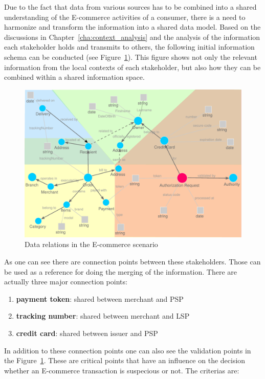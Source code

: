 Due to the fact that data from various sources has to be combined into a shared understanding of the \gls{E-commerce} activities of a consumer, there is a need to harmonize and transform the information into a shared data model. Based on the discussions in Chapter~\ref{cha:context_analysis} and the analysis of the information each stakeholder holds and transmits to others, the following initial information schema can be conducted (see Figure~\ref{fig:images_data_model}). This figure shows not only the relevant information from the local contexts of each stakeholder, but also how they can be combined within a shared information space. \\

\begin{figure}[!ht]
  \centering
  \includegraphics[width=0.9\columnwidth]{images/ontology_scenario_1.pdf}
  \caption{Data relations in the \gls{E-commerce} scenario\protect\footnotemark}
\label{fig:images_data_model}
\end{figure}

As one can see there are connection points between these stakeholders. Those can be used as a reference for doing the merging of the information. There are actually three major connection points: \@

\begin{enumerate}
  \item \textbf{payment token}: shared between merchant and \gls{PSP}
  \item \textbf{tracking number}: shared between merchant and \gls{LSP}
  \item \textbf{credit card}: shared between issuer and \gls{PSP}
\end{enumerate}

In addition to these connection points one can also see the validation points in the Figure~\ref{fig:images_data_model}. These are critical points that have an influence on the decision whether an \gls{E-commerce} transaction is suspecious or not. The criterias are: \@

